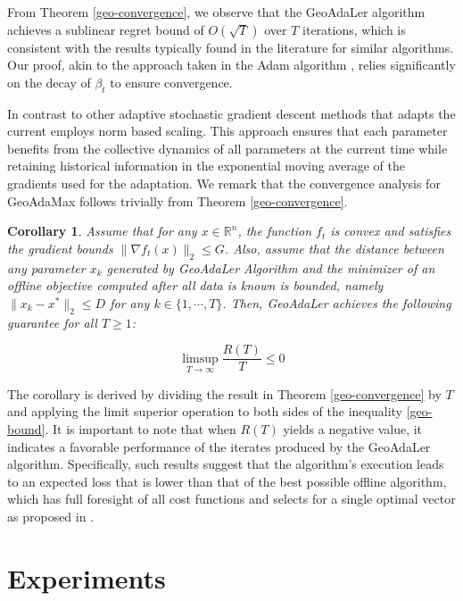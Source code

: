 \documentclass{article}
\newtheorem{corollary}{Corollary}
\begin{document}
\noindent
From Theorem \ref{geo-convergence}, we observe that the GeoAdaLer algorithm achieves a sublinear regret bound of \(O(\sqrt{T})\) over \( T \) iterations, which is consistent with the results typically found in the literature for similar algorithms. Our proof, akin to the approach taken in the Adam algorithm \citep{kingma2014adam}, relies significantly on the decay of $\beta_t$ to ensure convergence.

In contrast to other adaptive stochastic gradient descent methods that adapts the current employs norm based scaling. This approach ensures that each parameter benefits from the collective dynamics of all parameters at the current time while retaining historical information in the exponential moving average of the gradients used for the adaptation.
We remark that the convergence analysis for GeoAdaMax follows trivially from Theorem \ref{geo-convergence}.

\begin{corollary}
Assume that for any \(x \in \mathbb{R}^n\), the function \(f_t\) is convex and satisfies the gradient bounds \(\|\nabla f_t(x)\|_2 \leq G\). Also, assume that the distance between any parameter \(x_k\) generated by GeoAdaLer Algorithm and the minimizer of an offline objective computed after all data is known is bounded, namely \(\|x_k - x^*\|_2 \leq D\) for any \(k \in \{1, \cdots, T\}\). Then, GeoAdaLer achieves the following guarantee for all \(T \geq 1\):

\[
\limsup_{T \to \infty} \frac{R(T)}{T} \le 0
\]
\end{corollary}
\noindent
The corollary is derived by dividing the result in Theorem \ref{geo-convergence} by $T$ and applying the limit superior operation to both sides of the inequality \ref{geo-bound}. It is important to note that when \(R(T)\) yields a negative value, it indicates a favorable performance of the iterates produced by the GeoAdaLer algorithm. Specifically, such results suggest that the algorithm's execution leads to an expected loss that is lower than that of the best possible offline algorithm, which has full foresight of all cost functions and selects for a single optimal vector as proposed in \cite{zinkevich2003online}.

\section{Experiments}\label{experiments}
\end{document}

